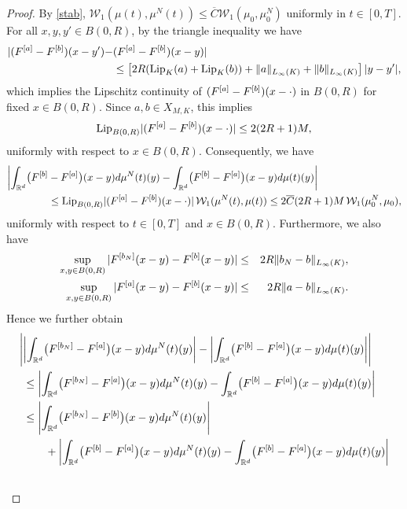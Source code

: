 \begin{proof}
	By \eqref{stab}, $\mathcal{W}_1(\mu(t),\mu^N(t))\leq\overline{C}\mathcal{W}_1(\mu_0,\mu_0^N)$ uniformly in $t \in [0,T]$.
	For all $x,y,y' \in B(0,R)$, by the triangle inequality we have
	\begin{align*}
		|(F^{[a]} -F^{[b]})(x-y') - &(F^{[a]} -F^{[b]})(x- y)|  \\
			& \leq \left[2R (\textup{Lip}_K(a) + \textup{Lip}_K( b))    +\|a\|_{L_\infty(K)} + \| b\|_{L_\infty(K)} \right] |y-y'|,
	\end{align*}
	which implies the Lipschitz continuity of $(F^{[a]} -F^{[b]})(x- \cdot)$ in $B(0,R)$ for fixed $x\in B(0,R)$. Since $a,b \in X_{M,K}$, this implies
	\begin{equation}\label{lipfafb}
		\textup{Lip}_{B(0,R)}|(F^{[a]} -F^{[b]})(x-\cdot)|\leq 2 (2R+1)M,
	\end{equation}
	uniformly with respect to $x \in B(0,R)$. Consequently, we have
	\begin{align*}
		\biggl|\int_{\mathbb{R}^d}\bigl(F^{[b]}
			&-F^{[a]}\bigr)(x-y)d\mu^{N}(t)(y)-\int_{\mathbb{R}^d}\bigl(F^{[b]}-F^{[a]}\bigr)(x-y)d\mu(t)(y)\biggr|\\
			&\leq\textup{Lip}_{B(0,R)}|(F^{[a]} -F^{[b]})(x-\cdot)|\,\mathcal{W}_1(\mu^N(t),\mu(t))
				\leq 2 \overline{C}(2R+1)M\,\mathcal{W}_1(\mu_0^N,\mu_0),
	\end{align*}
	uniformly with respect to $t\in [0,T]$ and $x\in B(0,R)$. Furthermore, we also have
	\begin{eqnarray}
		\sup_{x,y \in B(0,R)}|F^{[b_{N}]}(x-y)-F^{[b]}(x-y)|&\leq& 2R \| b_{N}- b\|_{L_\infty(K)},\label{absbounda}\\
	\sup_{x,y \in B(0,R)}|F^{[a]}(x-y)-F^{[b]}(x-y)|	&\leq& 2R \| a- b\|_{L_\infty(K)}. \label{absbound}
	\end{eqnarray}
	Hence we further obtain
	\begin{align} \label{machecazzo}
		\Biggl|
			&\biggl|\int_{\R^d}\bigl(\Fun{b_{N}}-\Fun{a}\bigr)(x-y)d\mu^{N}(t)(y)\biggr| 
				-\biggl|\int_{\R^d}\bigl(\Fun{b}-\Fun{a}\bigr)(x-y)d\mu(t)(y)\biggr|\Biggr|\\ \nonumber
			&\leq\biggl|\int_{\R^d}\bigl(\Fun{b_{N}}-\Fun{a}\bigr)(x-y)d\mu^{N}(t)(y)
					-\int_{\R^d}\bigl(\Fun{b}-\Fun{a}\bigr)(x-y)d\mu(t)(y)\biggr|\\ \nonumber
			&\leq\Biggl|\int_{\R^d}
				\bigl(\Fun{b_{N}}-\Fun{b}\bigr)(x-y)d\mu^{N}(t)(y)\Biggr|\\ \nonumber
			&\qquad +\biggl|\int_{\R^d}\bigl(\Fun{b}-\Fun{a}\bigr)(x-y)d\mu^{N}(t)(y)
					-\int_{\R^d}\bigl(\Fun{b}-\Fun{a}\bigr)(x-y)d\mu(t)(y)\biggr|\\ \nonumber

\end{align}
\end{proof}
